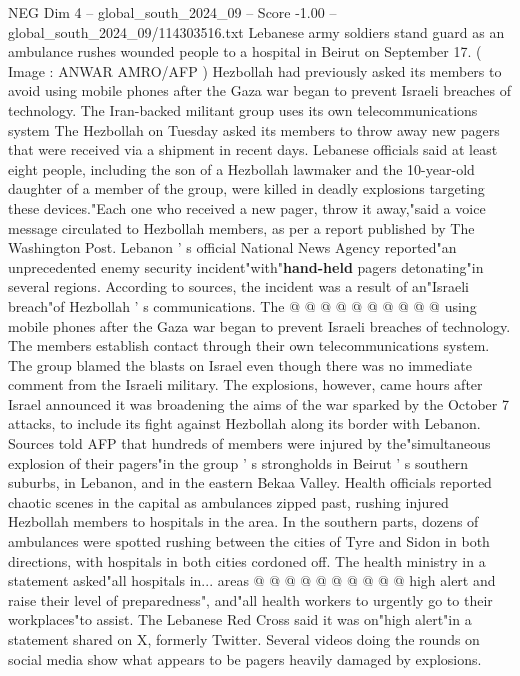 \begin{textsample}{NEG Dim 4 – global\_south\_2024\_09 – Score -1.00 – global\_south\_2024\_09/114303516.txt}  \label{ex:f4_neg_182}
Lebanese army soldiers stand guard as an ambulance rushes wounded people to a hospital in Beirut on September 17. ( Image : ANWAR AMRO/AFP ) Hezbollah had previously asked its members to avoid using mobile phones after the Gaza war began to prevent Israeli breaches of technology.
The Iran-backed militant group uses its own telecommunications system The Hezbollah on Tuesday asked its members to throw away new pagers that were received via a shipment in recent days.
Lebanese officials said at least eight people, including the son of a Hezbollah lawmaker and the 10-year-old daughter of a member of the group, were killed in deadly explosions targeting these devices."Each one who received a new pager, throw it away,"said a voice message circulated to Hezbollah members, as per a report published by The Washington Post.
Lebanon ' s official National News Agency reported"an unprecedented enemy security incident"with"\textbf{hand-held} pagers detonating"in several regions.
According to sources, the incident was a result of an"Israeli breach"of Hezbollah ' s communications.
The @ @ @ @ @ @ @ @ @ @ using mobile phones after the Gaza war began to prevent Israeli breaches of technology.
The members establish contact through their own telecommunications system.
The group blamed the blasts on Israel even though there was no immediate comment from the Israeli military.
The explosions, however, came hours after Israel announced it was broadening the aims of the war sparked by the October 7 attacks, to include its fight against Hezbollah along its border with Lebanon.
Sources told AFP that hundreds of members were injured by the"simultaneous explosion of their pagers"in the group ' s strongholds in Beirut ' s southern suburbs, in Lebanon, and in the eastern Bekaa Valley.
Health officials reported chaotic scenes in the capital as ambulances zipped past, rushing injured Hezbollah members to hospitals in the area.
In the southern parts, dozens of ambulances were spotted rushing between the cities of Tyre and Sidon in both directions, with hospitals in both cities cordoned off.
The health ministry in a statement asked"all hospitals in... areas @ @ @ @ @ @ @ @ @ @ high alert and raise their level of preparedness", and"all health workers to urgently go to their workplaces"to assist.
The Lebanese Red Cross said it was on"high alert"in a statement shared on X, formerly Twitter.
Several videos doing the rounds on social media show what appears to be pagers heavily damaged by explosions.

\end{textsample}

